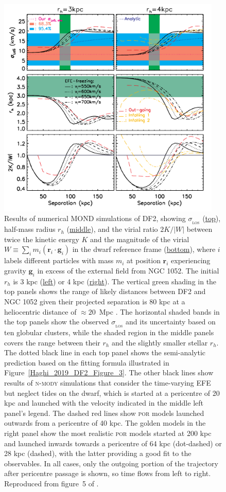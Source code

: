 \documentclass[fleqn,usenatbib,useAMS,onecolumn]{mnras} %
\begin{document}
\begin{figure}
	\centering
	\includegraphics[width=0.95\textwidth]{Haghi_2019_DF2_Figure_5}
	\caption{Results of numerical MOND simulations of DF2, showing $\sigma_{_\text{LOS}}$ (\underline{top}), half-mass radius $r_h$ (\underline{middle}), and the virial ratio $2K/\left|W\right|$ between twice the kinetic energy $K$ and the magnitude of the virial $W \equiv \sum_i m_i \left( \bm{r}_i \cdot \bm{g}_i \right)$ in the dwarf reference frame (\underline{bottom}), where $i$ labels different particles with mass $m_i$ at position $\bm{r}_i$ experiencing gravity $\bm{g}_i$ in excess of the external field from NGC 1052. The initial $r_h$ is 3 kpc (\underline{left}) or 4 kpc (\underline{right}). The vertical green shading in the top panels shows the range of likely distances between DF2 and NGC 1052 given their projected separation is 80 kpc at a heliocentric distance of $\approx 20$~Mpc \citep{Shen_2021}. The horizontal shaded bands in the top panels show the observed $\sigma_{_\text{LOS}}$ and its uncertainty based on ten globular clusters, while the shaded region in the middle panels covers the range between their $r_h$ and the slightly smaller stellar $r_h$. The dotted black line in each top panel shows the semi-analytic prediction based on the fitting formula illustrated in Figure~\ref{Haghi_2019_DF2_Figure_3}. The other black lines show results of \textsc{n-mody} simulations that consider the time-varying EFE but neglect tides on the dwarf, which is started at a pericentre of 20 kpc and launched with the velocity indicated in the middle left panel's legend. The dashed red lines show \textsc{por} models launched outwards from a pericentre of 40 kpc. The golden models in the right panel show the most realistic \textsc{por} models started at 200 kpc and launched inwards towards a pericentre of 64 kpc (dot-dashed) or 28 kpc (dashed), with the latter providing a good fit to the observables. In all cases, only the outgoing portion of the trajectory after pericentre passage is shown, so time flows from left to right. Reproduced from figure~5 of \citet{Haghi_2019_DF2}.}

\end{figure}
\end{document}
